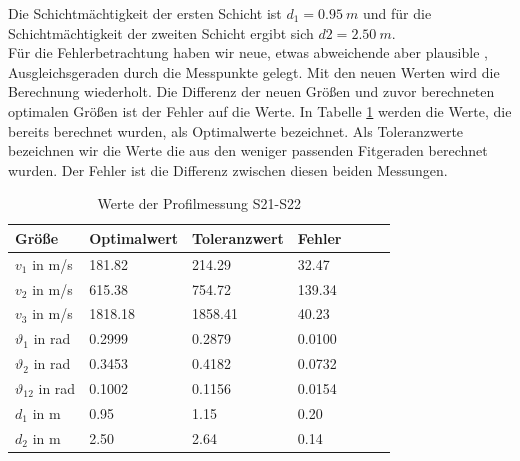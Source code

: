 Die Schichtmächtigkeit der ersten Schicht ist $d_1 =\SI{0.95}{m}$ und für die Schichtmächtigkeit der zweiten Schicht ergibt sich $d2 = \SI{2.50}{m}$.\\

Für die Fehlerbetrachtung haben wir neue, etwas abweichende aber plausible , 
Ausgleichsgeraden durch die Messpunkte gelegt. Mit den neuen Werten wird die Berechnung wiederholt. Die Differenz der neuen Größen und zuvor berechneten optimalen Größen ist der Fehler auf die Werte. In Tabelle \ref{tab:S21-S22} werden die Werte, die bereits berechnet wurden, als Optimalwerte bezeichnet. Als Toleranzwerte bezeichnen wir die Werte die aus den weniger passenden Fitgeraden berechnet wurden. Der Fehler ist die Differenz zwischen diesen beiden Messungen.


\begin{table}[!ht]
\centering
\caption{Werte der Profilmessung S21-S22}
\label{tab:S21-S22}
\begin{tabular}{lllllll}
\toprule
Größe   & Optimalwert   & Toleranzwert   & Fehler \\
\midrule
$v_1$ in m/s & 181.82 & 214.29 & 32.47 \\
$v_2$ in m/s & 615.38 & 754.72 & 139.34 \\
$v_3$ in m/s & 1818.18 & 1858.41 & 40.23 \\
$\vartheta_1$ in rad & 0.2999 & 0.2879 & 0.0100 \\
$\vartheta_2$ in rad & 0.3453 & 0.4182 & 0.0732 \\
$\vartheta_{12}$ in rad & 0.1002 & 0.1156 & 0.0154 \\
$d_1$ in m & 0.95 & 1.15 & 0.20 \\
$d_2$ in m & 2.50 & 2.64 & 0.14 \\

\bottomrule
\end{tabular}
\end{table}

